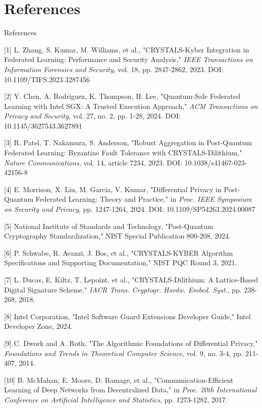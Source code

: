 \documentclass[aspectratio=169,11pt]{beamer}
\begin{document}
\section{References}
\begin{frame}[allowframebreaks]{References}
\footnotesize

[1] L. Zhang, S. Kumar, M. Williams, et al., "CRYSTALS-Kyber Integration in Federated Learning: Performance and Security Analysis," \textit{IEEE Transactions on Information Forensics and Security}, vol. 18, pp. 2847-2862, 2023. DOI: 10.1109/TIFS.2023.3287456

[2] Y. Chen, A. Rodriguez, K. Thompson, H. Lee, "Quantum-Safe Federated Learning with Intel SGX: A Trusted Execution Approach," \textit{ACM Transactions on Privacy and Security}, vol. 27, no. 2, pp. 1-28, 2024. DOI: 10.1145/3627543.3627891

[3] R. Patel, T. Nakamura, S. Anderson, "Robust Aggregation in Post-Quantum Federated Learning: Byzantine Fault Tolerance with CRYSTALS-Dilithium," \textit{Nature Communications}, vol. 14, article 7234, 2023. DOI: 10.1038/s41467-023-42156-8

[4] E. Morrison, X. Liu, M. Garcia, V. Kumar, "Differential Privacy in Post-Quantum Federated Learning: Theory and Practice," in \textit{Proc. IEEE Symposium on Security and Privacy}, pp. 1247-1264, 2024. DOI: 10.1109/SP54263.2024.00087

[5] National Institute of Standards and Technology, "Post-Quantum Cryptography Standardization," NIST Special Publication 800-208, 2024.

[6] P. Schwabe, R. Avanzi, J. Bos, et al., "CRYSTALS-KYBER Algorithm Specifications and Supporting Documentation," NIST PQC Round 3, 2021.

[7] L. Ducas, E. Kiltz, T. Lepoint, et al., "CRYSTALS-Dilithium: A Lattice-Based Digital Signature Scheme," \textit{IACR Trans. Cryptogr. Hardw. Embed. Syst.}, pp. 238-268, 2018.

[8] Intel Corporation, "Intel Software Guard Extensions Developer Guide," Intel Developer Zone, 2024.

[9] C. Dwork and A. Roth, "The Algorithmic Foundations of Differential Privacy," \textit{Foundations and Trends in Theoretical Computer Science}, vol. 9, no. 3-4, pp. 211-407, 2014.

[10] B. McMahan, E. Moore, D. Ramage, et al., "Communication-Efficient Learning of Deep Networks from Decentralized Data," in \textit{Proc. 20th International Conference on Artificial Intelligence and Statistics}, pp. 1273-1282, 2017.


\end{frame}
\end{document}
